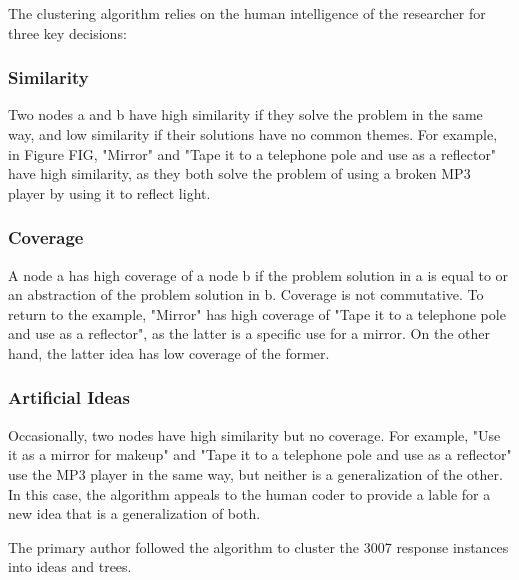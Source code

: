 The clustering algorithm relies on the human intelligence of the researcher for three key decisions:

\subsubsection{Similarity}
Two nodes a and b have high similarity if they solve the problem in the same way, and low similarity if their solutions have no common themes. For example, in Figure FIG, "Mirror" and "Tape it to a telephone pole and use as a reflector" have high similarity, as they both solve the problem of using a broken MP3 player by using it to reflect light.

\subsubsection{Coverage}
A node a has high coverage of a node b if the problem solution in a is equal to or an abstraction of the problem solution in b. Coverage is not commutative. To return to the example, "Mirror" has high coverage of "Tape it to a telephone pole and use as a reflector", as the latter is a specific use for a mirror. On the other hand, the latter idea has low coverage of the former.

\subsubsection{Artificial Ideas}
Occasionally, two nodes have high similarity but no coverage. For example, "Use it as a mirror for makeup" and "Tape it to a telephone pole and use as a reflector" use the MP3 player in the same way, but neither is a generalization of the other. In this case, the algorithm appeals to the human coder to provide a lable for a new idea that is a generalization of both.

The primary author followed the algorithm to cluster the 3007 response instances into ideas and trees.